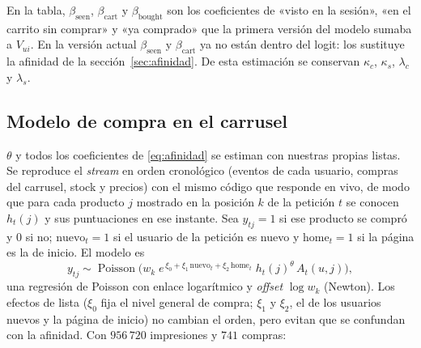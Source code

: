 \documentclass[11pt,a4paper]{article}
\newcommand{\Poi}{\operatorname{Poisson}}
\begin{document}
En la tabla, $\beta_{\text{seen}}$, $\beta_{\text{cart}}$ y $\beta_{\text{bought}}$ son los coeficientes de «visto
en la sesión», «en el carrito sin comprar» y «ya comprado» que la primera versión del modelo sumaba a
$V_{ui}$. En la versión actual $\beta_{\text{seen}}$ y $\beta_{\text{cart}}$ ya no están dentro del logit: los
sustituye la afinidad de la sección~\ref{sec:afinidad}. De esta estimación se conservan $\kappa_c$,
$\kappa_s$, $\lambda_c$ y $\lambda_s$.

\subsection{Modelo de compra en el carrusel}\label{sec:poisson}

$\theta$ y todos los coeficientes de \eqref{eq:afinidad} se estiman con nuestras propias listas. Se
reproduce el \emph{stream} en orden cronológico (eventos de cada usuario, compras del carrusel, stock y
precios) con el mismo código que responde en vivo, de modo que para cada producto $j$ mostrado en la
posición $k$ de la petición $t$ se conocen $h_t(j)$ y sus puntuaciones en ese instante. Sea $y_{tj}=1$ si
ese producto se compró y $0$ si no; $\text{nuevo}_t=1$ si el usuario de la petición es nuevo y
$\text{home}_t=1$ si la página es la de inicio. El modelo es
\begin{equation}
y_{tj}\sim\Poi\Big(w_k\;e^{\,\xi_0+\xi_1\,\text{nuevo}_t+\xi_2\,\text{home}_t}\;h_t(j)^{\theta}\,A_t(u,j)\Big),
\label{eq:poisson}
\end{equation}
una regresión de Poisson con enlace logarítmico y \emph{offset} $\log w_k$ (Newton). Los efectos de
lista ($\xi_0$ fija el nivel general de compra; $\xi_1$ y $\xi_2$, el de los usuarios nuevos y la página de
inicio) no cambian el orden, pero evitan que se confundan con la afinidad. Con $956\,720$
impresiones y $741$ compras:
\end{document}
